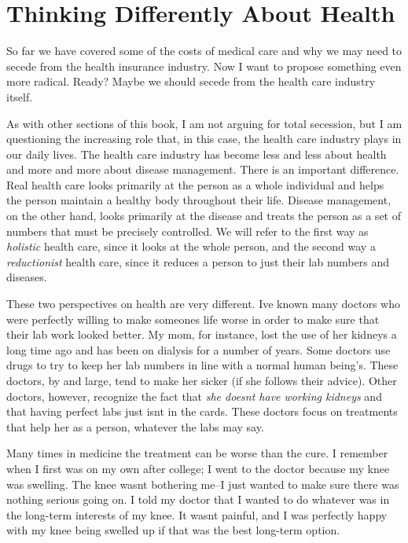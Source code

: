 \section{Thinking Differently About Health}

So far we have covered some of the costs of medical care and why we may
need to secede from the health insurance industry. Now I want to
propose something
even more
radical. Ready? Maybe
we should secede from the health care industry itself.

As with other sections
of this book, I am not arguing for total
secession, but 
I am questioning the
increasing role that,
in this case, the health care industry plays in our daily lives. The
health care industry has become less and less about health and more and
more about disease management. There is an important difference. Real
health care looks primarily at the person as a whole individual and
helps the person maintain a healthy body throughout their life. Disease
management, on the other hand, looks primarily at the disease and
treats the person as a set of numbers that must be precisely
controlled. We will refer to the first way as \textit{holistic} health
care, since it looks at the whole person, and the second way a
\textit{reductionist} health care, since it reduces a person to just
their lab numbers and diseases.

These two perspectives on health are very different.
I{\textquotesingle}ve known many doctors who were perfectly willing to
make someone{\textquotesingle}s life worse in order to make sure that
their lab work looked better. My mom, for instance, lost the use of her
kidneys a long time ago and has been on dialysis for a number of years.
Some doctors use drugs to try to keep her lab numbers in line with a
normal human being’s. These doctors, by and large, tend to make her
sicker (if she follows their advice). Other doctors, however, recognize
the fact that \textit{she doesn{\textquotesingle}t have working
kidneys} and that having perfect labs just isn{\textquotesingle}t in
the cards.  These doctors focus on treatments that help her as a
person, whatever the labs may say.

Many times in medicine the treatment can be worse than the cure. I
remember when I first was on my own after college; I went to the doctor
because my knee was swelling. The knee wasn{\textquotesingle}t
bothering me–I just wanted to make sure there was nothing serious
going on. I told my
doctor that I wanted to do whatever was in the long-term interests of
my knee. It wasn{\textquotesingle}t painful, and I was perfectly happy
with my knee being swelled up if that was the best long-term option. 

